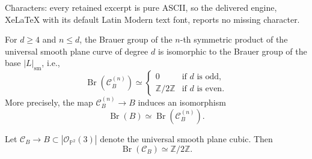 \documentclass[10pt,a4paper]{amsart}
\DeclareMathOperator{\Br}{Br}
\begin{document}
Characters: every retained excerpt is pure ASCII, so the delivered engine, XeLaTeX with its default Latin Modern text font, reports no missing character.
\begin{prop}\label{prop: brauer of symm}
    For $d\geq 4$ and $n\leq d$, the Brauer group of the $n$-th symmetric product of the universal smooth plane curve of degree $d$ is isomorphic to the Brauer group of the base $|L|_{\mathrm{sm}}$, i.e.,
    $$\Br(\mathcal C_B^{(n)}) \simeq \begin{cases}0 & \text{if } d \text{ is odd,} \\
    \mathbb Z / 2 \mathbb Z &\text{if } d \text{ is even.}\end{cases}$$
More precisely, the map $\mathcal C_B^{(n)} \to B$ induces an isomorphism
$$\Br(B) \simeq \Br(\mathcal C_B^{(n)}).$$
\end{prop}

\begin{lem}\label{lem: appendixc0}
    Let $\mathcal C_B \to B \subset |\mathcal O_{\mathbb P^2}(3)|$ denote the universal smooth plane cubic. Then
    $$\Br(\mathcal C_B) \simeq \mathbb Z/2\mathbb Z.$$
\end{lem}
\end{document}
